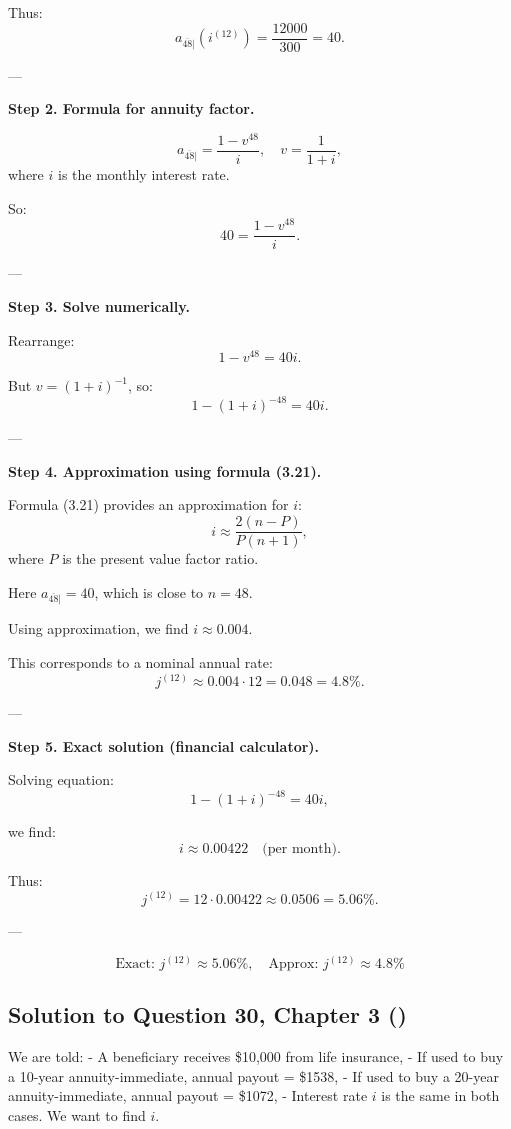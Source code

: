 \documentclass[12pt, a4paper]{article}
\begin{document}
Thus:
\[
a_{\overline{48}|}(i^{(12)}) = \frac{12000}{300} = 40.
\]

---

\textbf{Step 2. Formula for annuity factor.}

\[
a_{\overline{48}|} = \frac{1-v^{48}}{i}, 
\quad v=\frac{1}{1+i},
\]
where $i$ is the monthly interest rate.

So:
\[
40 = \frac{1-v^{48}}{i}.
\]

---

\textbf{Step 3. Solve numerically.}

Rearrange:
\[
1-v^{48} = 40i.
\]

But $v=(1+i)^{-1}$, so:
\[
1-(1+i)^{-48} = 40i.
\]

---

\textbf{Step 4. Approximation using formula (3.21).}

Formula (3.21) provides an approximation for $i$:
\[
i \approx \frac{2(n-P)}{P(n+1)},
\]
where $P$ is the present value factor ratio.

Here $a_{\overline{48}|} = 40$, which is close to $n=48$.

Using approximation, we find $i \approx 0.004$.  

This corresponds to a nominal annual rate:
\[
j^{(12)} \approx 0.004 \cdot 12 = 0.048 = 4.8\%.
\]

---

\textbf{Step 5. Exact solution (financial calculator).}

Solving equation:
\[
1-(1+i)^{-48} = 40i,
\]

we find:
\[
i \approx 0.00422 \quad \text{(per month)}.
\]

Thus:
\[
j^{(12)} = 12 \cdot 0.00422 \approx 0.0506 = 5.06\%.
\]

---

\[
\boxed{\text{Exact: } j^{(12)} \approx 5.06\%, \quad \text{Approx: } j^{(12)} \approx 4.8\%}
\]

\subsection*{Solution to Question 30, Chapter 3 (\cite{toi3rd})}

We are told:  
- A beneficiary receives \$10{,}000 from life insurance,  
- If used to buy a 10-year annuity-immediate, annual payout = \$1538,  
- If used to buy a 20-year annuity-immediate, annual payout = \$1072,  
- Interest rate $i$ is the same in both cases.  
We want to find $i$.
\end{document}

